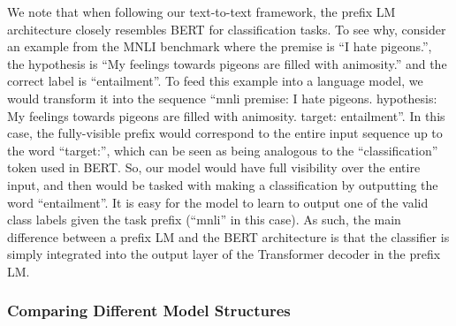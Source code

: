 \documentclass[twoside,11pt]{article}
\begin{document}
We note that when following our text-to-text framework, the prefix LM architecture closely resembles BERT \citep{devlin2018bert} for classification tasks.
To see why, consider an example from the MNLI benchmark where the premise is ``I hate pigeons.'', the hypothesis is ``My feelings towards pigeons are filled with animosity.'' and the correct label is ``entailment''.
To feed this example into a language model, we would transform it into the sequence ``mnli premise: I hate pigeons. hypothesis: My feelings towards pigeons are filled with animosity. target: entailment''.
In this case, the fully-visible prefix would correspond to the entire input sequence up to the word ``target:'', which can be seen as being analogous to the ``classification'' token used in BERT.
So, our model would have full visibility over the entire input, and then would be tasked with making a classification by outputting the word ``entailment''.
It is easy for the model to learn to output one of the valid class labels given the task prefix (``mnli'' in this case).
As such, the main difference between a prefix LM and the BERT architecture is that the classifier is simply integrated into the output layer of the Transformer decoder in the prefix LM.

\subsubsection{Comparing Different Model Structures}
\label{sec:architecture_variants}
\end{document}
